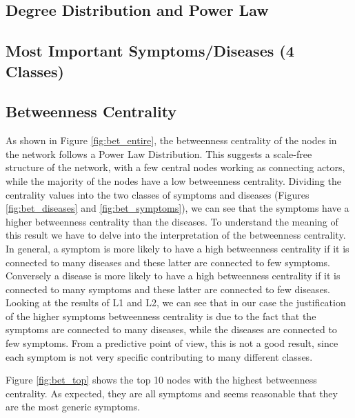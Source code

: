 
\subsection{Degree Distribution and Power Law}


\subsection{Most Important Symptoms/Diseases (4 Classes)}


\subsection{Betweenness Centrality}
As shown in Figure \ref{fig:bet_entire}, the betweenness centrality of the nodes in the network follows a Power Law Distribution. This suggests
a scale-free structure of the network, with a few central nodes working as connecting actors, while the majority of the nodes have a low betweenness centrality.
Dividing the centrality values into the two classes of symptoms and diseases (Figures \ref{fig:bet_diseases} and \ref{fig:bet_symptoms}), we can see that 
the symptoms have a higher betweenness centrality than the diseases. To understand the meaning of this result we have to delve into
the interpretation of the betweenness centrality. In general, a symptom is more likely to have a high betweenness centrality if it is
connected to many diseases and these latter are connected to few symptoms. Conversely a disease is more likely to have a high betweenness centrality
if it is connected to many symptoms and these latter are connected to few diseases. Looking at the results of L1 and L2, we can see that in our case
the justification of the higher symptoms betweenness centrality is due to the fact that the symptoms are connected to many diseases, while the diseases
are connected to few symptoms.
From a predictive point of view, this is not a good result, since each symptom is not very specific contributing to many different classes.

Figure \ref{fig:bet_top} shows the top 10 nodes with the highest betweenness centrality. As expected, they are all symptoms and seems 
reasonable that they are the most generic symptoms.

